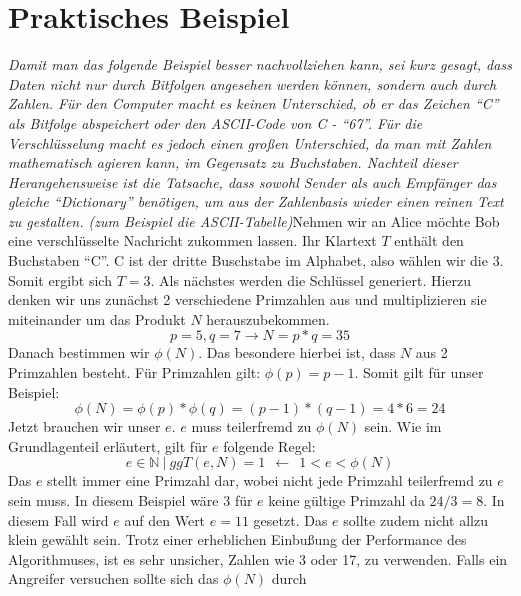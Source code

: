 \section{Praktisches Beispiel}
\emph{Damit man das folgende Beispiel besser nachvollziehen kann, sei kurz
gesagt, dass Daten nicht nur durch Bitfolgen angesehen werden können, sondern
auch durch Zahlen. Für den Computer macht es keinen Unterschied, ob er das Zeichen "`C"'
als Bitfolge abspeichert oder den ASCII-Code von C - "`67"'. Für die
Verschlüsselung macht es jedoch einen großen Unterschied, da man mit Zahlen
mathematisch agieren kann, im Gegensatz zu Buchstaben. Nachteil dieser
Herangehensweise ist die Tatsache, dass sowohl Sender als auch Empfänger
das gleiche "`Dictionary"' benötigen, um aus der Zahlenbasis wieder einen reinen
Text zu gestalten. (zum Beispiel die
ASCII-Tabelle)}\newline\newline Nehmen wir an Alice möchte Bob eine
verschlüsselte Nachricht zukommen lassen.
Ihr Klartext $T$ enthält den Buchstaben "`C"'. C ist der dritte Buschstabe im
Alphabet, also wählen wir die 3. Somit ergibt sich $T = 3$.
Als nächstes werden die Schlüssel generiert. Hierzu denken wir uns zunächst 2
verschiedene Primzahlen aus und multiplizieren sie miteinander um das
Produkt $N$ herauszubekommen.
\begin{displaymath}
p = 5, q = 7 \rightarrow N = p * q = 35
\end{displaymath}
Danach bestimmen wir $\phi(N)$. Das besondere hierbei ist, dass $N$ aus
2 Primzahlen besteht. Für Primzahlen gilt: $ \phi(p) = p-1$. Somit gilt für
unser Beispiel:
\begin{displaymath}
\phi(N) = \phi(p) * \phi(q) = (p-1)*(q-1) = 4*6 = 24
\end{displaymath}
Jetzt brauchen wir unser $e$. $e$ muss teilerfremd zu $\phi(N)$ sein. Wie im
Grundlagenteil erläutert, gilt für $e$ folgende Regel:
\begin{displaymath}
e \in \mathbb{N} \ | \ ggT(e,N) = 1 \ \ \gets \  \ 1<e<\phi(N)
\end{displaymath}
Das $e$ stellt immer eine Primzahl dar, wobei nicht jede Primzahl teilerfremd
zu $e$ sein muss. In diesem Beispiel wäre 3 für $e$ keine gültige Primzahl da
$24/3 = 8$. In diesem Fall wird $e$ auf den Wert $e = 11$ gesetzt. Das
$e$ sollte zudem nicht allzu klein gewählt sein. Trotz einer erheblichen
Einbußung der Performance des Algorithmuses, ist es sehr unsicher, Zahlen wie 3
oder 17, zu verwenden. Falls ein Angreifer versuchen sollte sich das $\phi(N)$ durch
